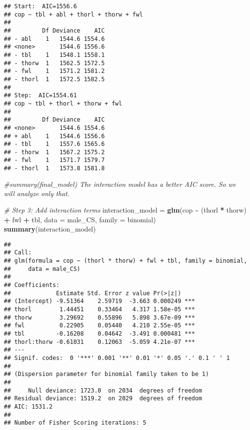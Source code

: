 \documentclass[
]{article}
\newenvironment{Shaded}{\begin{snugshade}}{\end{snugshade}}
\newcommand{\AttributeTok}[1]{\textcolor[rgb]{0.13,0.29,0.53}{#1}}
\newcommand{\CommentTok}[1]{\textcolor[rgb]{0.56,0.35,0.01}{\textit{#1}}}
\newcommand{\FunctionTok}[1]{\textcolor[rgb]{0.13,0.29,0.53}{\textbf{#1}}}
\newcommand{\NormalTok}[1]{#1}
\newcommand{\OtherTok}[1]{\textcolor[rgb]{0.56,0.35,0.01}{#1}}
\newcommand{\SpecialCharTok}[1]{\textcolor[rgb]{0.81,0.36,0.00}{\textbf{#1}}}
\begin{document}
\begin{verbatim}
## Start:  AIC=1556.6
## cop ~ tbl + abl + thorl + thorw + fwl
## 
##         Df Deviance    AIC
## - abl    1   1544.6 1554.6
## <none>       1544.6 1556.6
## - tbl    1   1548.1 1558.1
## - thorw  1   1562.5 1572.5
## - fwl    1   1571.2 1581.2
## - thorl  1   1572.5 1582.5
## 
## Step:  AIC=1554.61
## cop ~ tbl + thorl + thorw + fwl
## 
##         Df Deviance    AIC
## <none>       1544.6 1554.6
## + abl    1   1544.6 1556.6
## - tbl    1   1557.6 1565.6
## - thorw  1   1567.2 1575.2
## - fwl    1   1571.7 1579.7
## - thorl  1   1573.8 1581.8
\end{verbatim}

\begin{Shaded}
\begin{Highlighting}[]
\CommentTok{\#summary(final\_model) The interaction model has a better AIC score. So we will analyze only that.}

\CommentTok{\# Step 3: Add interaction terms}
\NormalTok{interaction\_model }\OtherTok{=} \FunctionTok{glm}\NormalTok{(cop }\SpecialCharTok{\textasciitilde{}}\NormalTok{ (thorl }\SpecialCharTok{*}\NormalTok{ thorw) }\SpecialCharTok{+}\NormalTok{ fwl }\SpecialCharTok{+}\NormalTok{ tbl, }
                         \AttributeTok{data =}\NormalTok{ male\_CS, }\AttributeTok{family =}\NormalTok{ binomial)}
\FunctionTok{summary}\NormalTok{(interaction\_model)}
\end{Highlighting}
\end{Shaded}

\begin{verbatim}
## 
## Call:
## glm(formula = cop ~ (thorl * thorw) + fwl + tbl, family = binomial, 
##     data = male_CS)
## 
## Coefficients:
##             Estimate Std. Error z value Pr(>|z|)    
## (Intercept) -9.51364    2.59719  -3.663 0.000249 ***
## thorl        1.44451    0.33464   4.317 1.58e-05 ***
## thorw        3.29692    0.55896   5.898 3.67e-09 ***
## fwl          0.22905    0.05440   4.210 2.55e-05 ***
## tbl         -0.16208    0.04642  -3.491 0.000481 ***
## thorl:thorw -0.61031    0.12063  -5.059 4.21e-07 ***
## ---
## Signif. codes:  0 '***' 0.001 '**' 0.01 '*' 0.05 '.' 0.1 ' ' 1
## 
## (Dispersion parameter for binomial family taken to be 1)
## 
##     Null deviance: 1723.0  on 2034  degrees of freedom
## Residual deviance: 1519.2  on 2029  degrees of freedom
## AIC: 1531.2
## 
## Number of Fisher Scoring iterations: 5
\end{verbatim}
\end{document}
